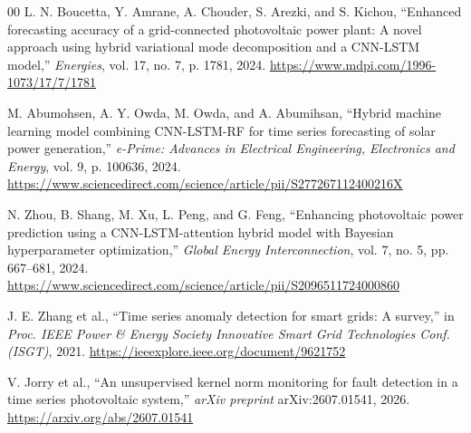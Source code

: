 \documentclass[conference]{IEEEtran}
\begin{document}
\begin{thebibliography}{00}
 L. N. Boucetta, Y. Amrane, A. Chouder, S. Arezki, and S. Kichou, ``Enhanced forecasting accuracy of a grid-connected photovoltaic power plant: A novel approach using hybrid variational mode decomposition and a CNN-LSTM model,'' \textit{Energies}, vol. 17, no. 7, p. 1781, 2024. \url{https://www.mdpi.com/1996-1073/17/7/1781}

 M. Abumohsen, A. Y. Owda, M. Owda, and A. Abumihsan, ``Hybrid machine learning model combining CNN-LSTM-RF for time series forecasting of solar power generation,'' \textit{e-Prime: Advances in Electrical Engineering, Electronics and Energy}, vol. 9, p. 100636, 2024. \url{https://www.sciencedirect.com/science/article/pii/S277267112400216X}

 N. Zhou, B. Shang, M. Xu, L. Peng, and G. Feng, ``Enhancing photovoltaic power prediction using a CNN-LSTM-attention hybrid model with Bayesian hyperparameter optimization,'' \textit{Global Energy Interconnection}, vol. 7, no. 5, pp. 667--681, 2024. \url{https://www.sciencedirect.com/science/article/pii/S2096511724000860}

 J. E. Zhang et al., ``Time series anomaly detection for smart grids: A survey,'' in \textit{Proc. IEEE Power \& Energy Society Innovative Smart Grid Technologies Conf. (ISGT)}, 2021. \url{https://ieeexplore.ieee.org/document/9621752}

 V. Jorry et al., ``An unsupervised kernel norm monitoring for fault detection in a time series photovoltaic system,'' \textit{arXiv preprint} arXiv:2607.01541, 2026. \url{https://arxiv.org/abs/2607.01541}

\end{thebibliography}
\end{document}
